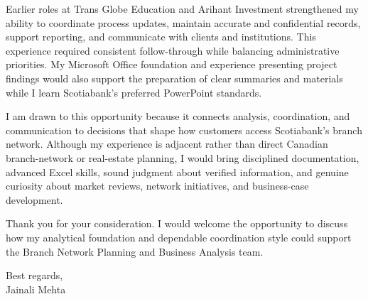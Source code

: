 \documentclass[letterpaper,11pt]{article}
\begin{document}
\bigbreak
Earlier roles at Trans Globe Education and Arihant Investment strengthened my ability to coordinate process updates, maintain accurate and confidential records, support reporting, and communicate with clients and institutions. This experience required consistent follow-through while balancing administrative priorities. My Microsoft Office foundation and experience presenting project findings would also support the preparation of clear summaries and materials while I learn Scotiabank's preferred PowerPoint standards.

\bigbreak
I am drawn to this opportunity because it connects analysis, coordination, and communication to decisions that shape how customers access Scotiabank's branch network. Although my experience is adjacent rather than direct Canadian branch-network or real-estate planning, I would bring disciplined documentation, advanced Excel skills, sound judgment about verified information, and genuine curiosity about market reviews, network initiatives, and business-case development.

\bigbreak
Thank you for your consideration. I would welcome the opportunity to discuss how my analytical foundation and dependable coordination style could support the Branch Network Planning and Business Analysis team.

\bigbreak
Best regards,\\
Jainali Mehta
\end{document}
